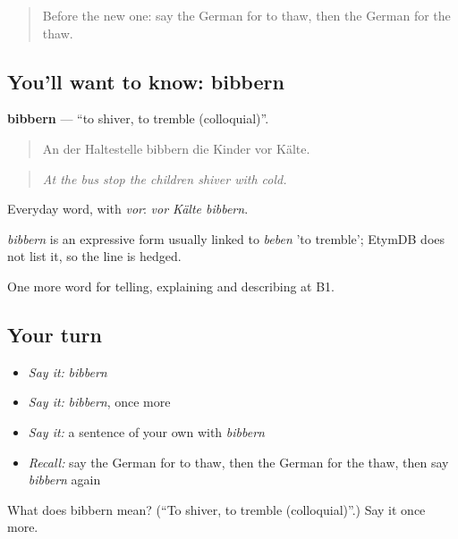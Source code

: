 \label{lesson:GE-C463-bibbern}



\begin{quote}
Before the new one: say the German for to thaw, then the German for the thaw.
\end{quote}

\subsection*{You'll want to know: bibbern}
\textbf{bibbern} — \textquotedblleft{}to shiver, to tremble (colloquial)\textquotedblright{}.

\begin{quote}
An der Haltestelle bibbern die Kinder vor Kälte.
\end{quote}

\begin{quote}
\emph{At the bus stop the children shiver with cold.}
\end{quote}

Everyday word, with \emph{vor}: \emph{vor Kälte bibbern}.

\begin{cousinweb}
\emph{bibbern} is an expressive form usually linked to \emph{beben} 'to tremble'; EtymDB does not list it, so the line is hedged.
\end{cousinweb}

\begin{grammarlens}[title={What you've built}]
One more word for telling, explaining and describing at B1.
\end{grammarlens}

\subsection*{Your turn}
\begin{itemize}
\raggedright
  \item \emph{Say it:} \emph{bibbern}
  \item \emph{Say it:} \emph{bibbern}, once more
  \item \emph{Say it:} a sentence of your own with \emph{bibbern}
  \item \emph{Recall:} say the German for to thaw, then the German for the thaw, then say \emph{bibbern} again
\end{itemize}

\begin{tcolorbox}[breakable,colback=teal!4,colframe=teal!35!black,title={Before you move on}]
What does bibbern mean? (\textquotedblleft{}To shiver, to tremble (colloquial)\textquotedblright{}.) Say it once more.
\end{tcolorbox}
